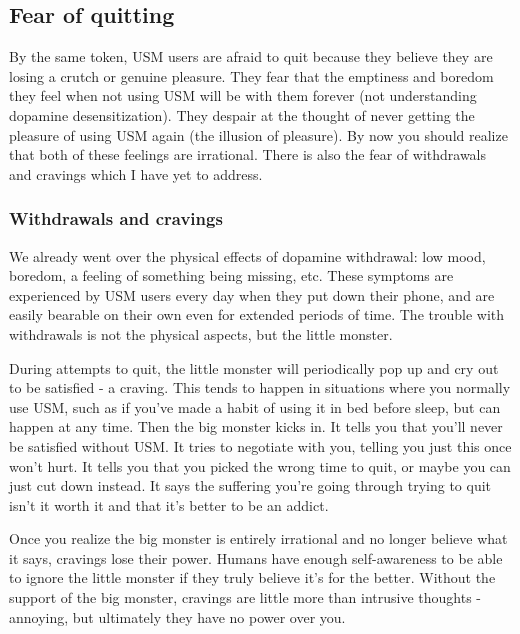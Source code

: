 \documentclass[
  openany]{book}
\begin{document}
\subsection{Fear of quitting}\label{fear-of-quitting}

By the same token, USM users are afraid to quit because they believe they are losing a crutch or genuine pleasure. They fear that the emptiness and boredom they feel when not using USM will be with them forever (not understanding dopamine desensitization). They despair at the thought of never getting the pleasure of using USM again (the illusion of pleasure). By now you should realize that both of these feelings are irrational. There is also the fear of withdrawals and cravings which I have yet to address.

\subsubsection*{Withdrawals and cravings}\label{withdrawals-and-cravings}

We already went over the physical effects of dopamine withdrawal: low mood, boredom, a feeling of something being missing, etc. These symptoms are experienced by USM users every day when they put down their phone, and are easily bearable on their own even for extended periods of time. The trouble with withdrawals is not the physical aspects, but the little monster.

During attempts to quit, the little monster will periodically pop up and cry out to be satisfied - a craving. This tends to happen in situations where you normally use USM, such as if you've made a habit of using it in bed before sleep, but can happen at any time. Then the big monster kicks in. It tells you that you'll never be satisfied without USM. It tries to negotiate with you, telling you just this once won't hurt. It tells you that you picked the wrong time to quit, or maybe you can just cut down instead. It says the suffering you're going through trying to quit isn't it worth it and that it's better to be an addict.

Once you realize the big monster is entirely irrational and no longer believe what it says, cravings lose their power. Humans have enough self-awareness to be able to ignore the little monster if they truly believe it's for the better. Without the support of the big monster, cravings are little more than intrusive thoughts - annoying, but ultimately they have no power over you.
\end{document}
